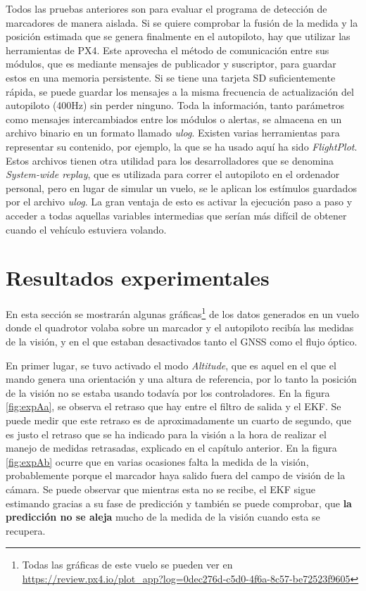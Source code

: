 Todos las pruebas anteriores son para evaluar el programa de detección de marcadores de manera aislada. Si se quiere comprobar la fusión de la medida y la posición estimada que se genera finalmente en el autopiloto, hay que utilizar las herramientas de PX4. Este aprovecha el método de comunicación entre sus módulos, que es mediante mensajes de publicador y suscriptor, para guardar estos en una memoria persistente. Si se tiene una tarjeta SD suficientemente rápida, se puede guardar los mensajes a la misma frecuencia de actualización del autopiloto (400Hz) sin perder ninguno. 
Toda la información, tanto parámetros como mensajes intercambiados entre los módulos o alertas, se almacena en un archivo binario en un formato llamado \textit{ulog}. Existen varias herramientas para representar su contenido, por ejemplo, la que se ha usado aquí ha sido \textit{FlightPlot}. Estos archivos tienen otra utilidad para los desarrolladores que se denomina \textit{System-wide replay}, que es utilizada para correr el autopiloto en el ordenador personal, pero en lugar de simular un vuelo, se le aplican los estímulos guardados por el archivo \textit{ulog}. La gran ventaja de esto es activar la ejecución paso a paso y acceder a todas aquellas variables intermedias que serían más difícil de obtener cuando el vehículo estuviera volando.


\section{Resultados experimentales}
En esta sección se mostrarán algunas gráficas\footnote{Todas las gráficas de este vuelo se pueden ver en \url{https://review.px4.io/plot\_app?log=0dec276d-c5d0-4f6a-8c57-be72523f9605}} de los datos generados en un vuelo donde el quadrotor volaba sobre un marcador y el autopiloto recibía las medidas de la visión, y en el que estaban desactivados tanto el GNSS como el flujo óptico. 

En primer lugar, se tuvo activado el modo \textit{Altitude}, que es aquel en el que el mando genera una orientación y una altura de referencia, por lo tanto la posición de la visión no se estaba usando todavía por los controladores. En la figura \ref{fig:expAa}, se observa el retraso que hay entre el filtro de salida y el EKF. Se puede medir que este retraso es de aproximadamente un cuarto de segundo, que es justo el retraso que se ha indicado para la visión a la hora de realizar el manejo de medidas retrasadas, explicado en el capítulo anterior. En la figura \ref{fig:expAb} ocurre que en varias ocasiones falta la medida de la visión, probablemente porque el marcador haya salido fuera del campo de visión de la cámara. Se puede observar que mientras esta no se recibe, el EKF sigue estimando gracias a su fase de predicción y también se puede comprobar, que \textbf{la predicción no se aleja} mucho de la medida de la visión cuando esta se recupera.

